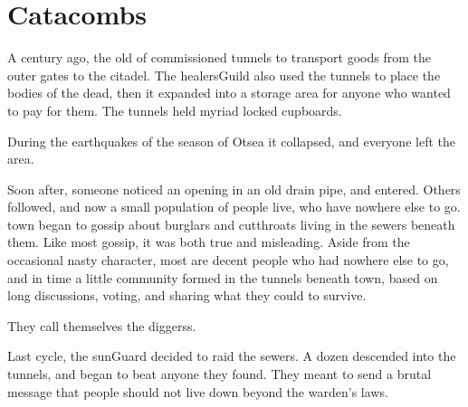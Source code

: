 \section{ Catacombs}
\label{sewers}


\begin{multicols}{2}

\begin{exampletext}
  \noindent
  A century ago, the old  of  commissioned tunnels to transport goods from the outer gates to the citadel.
  The \gls{healersGuild} also used the tunnels to place the bodies of the dead, then it expanded into a storage area for anyone who wanted to pay for them.
  The tunnels held myriad locked cupboards.


  During the earthquakes of the season of \gls{Otsea} it collapsed, and everyone left the area.


  Soon after, someone noticed an opening in an old drain pipe, and entered.
  Others followed, and now a small population of people live, who have nowhere else to go.
  \Gls{town} began to gossip about burglars and cutthroats living in the sewers beneath them.
  Like most gossip, it was both true and misleading.
  Aside from the occasional nasty character, most are decent people who had nowhere else to go, and in time a little community formed in the tunnels beneath \gls{town}, based on long discussions, voting, and sharing what they could to survive.

  They call themselves the \glspl{diggers}.
\end{exampletext}

\begin{exampletext}
  \label{guardAttackHistory}
  Last \gls{cycle}, the \gls{sunGuard} decided to raid the sewers.
  A dozen descended into the tunnels, and began to beat anyone they found.
  They meant to send a brutal message that people should not live down beyond the \gls{warden}'s laws.


\end{exampletext}
\end{multicols}
